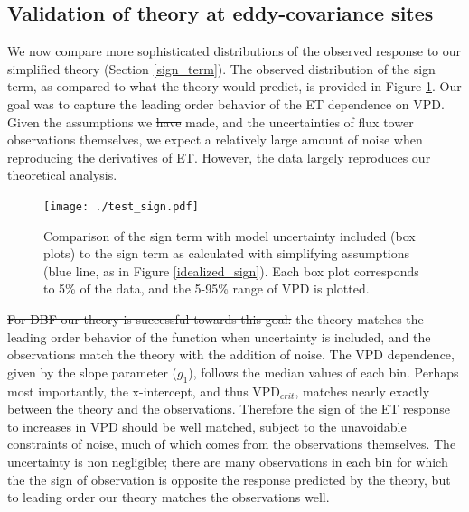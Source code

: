 \documentclass[draft,linenumbers]{agujournal}
\providecommand{\DIFadd}[1]{{\protect\color{blue}\uwave{#1}}} %
\providecommand{\DIFdel}[1]{{\protect\color{red}\sout{#1}}}                      %
\providecommand{\DIFaddbegin}{} %
\providecommand{\DIFaddend}{} %
\providecommand{\DIFdelbegin}{} %
\providecommand{\DIFdelend}{} %
\providecommand{\DIFaddbeginFL}{} %
\providecommand{\DIFaddendFL}{} %
\providecommand{\DIFdelbeginFL}{} %
\providecommand{\DIFdelendFL}{} %
\begin{document}
\subsection{Validation of theory at eddy-covariance sites}
\label{testing}
We now compare more sophisticated distributions of the observed
response to our simplified theory (Section \ref{sign_term}). The
observed distribution of the sign term, as compared to what the theory
would predict, is provided in Figure \ref{test_sign}. Our goal was to
capture the leading order behavior of the ET dependence on VPD. Given
the assumptions we \DIFdelbegin \DIFdel{have }\DIFdelend made, and the uncertainties of flux tower
observations themselves, we expect a relatively large amount of noise
when reproducing the derivatives of ET. However, the data largely
reproduces our theoretical analysis.

\begin{figure}
  \centering
  \DIFdelbeginFL %
\DIFdelendFL \DIFaddbeginFL \centerline{\texttt{[image: ./test\_sign.pdf]}}
  \DIFaddendFL \caption{Comparison of the sign term with model uncertainty included
    (box plots) to the sign term as calculated with simplifying
    assumptions (blue line, as in Figure \ref{idealized_sign}). Each
    box plot corresponds to 5\% of the data, and the 5-95\% range of
    VPD is plotted.}
  \label{test_sign}
\end{figure}

\DIFdelbegin \DIFdel{For DBF our theory is successful towards this goal: }\DIFdelend \DIFaddbegin \DIFadd{This is particularly true for DBF and MF; }\DIFaddend the theory matches the
leading order behavior of the function when uncertainty is included,
and the observations match the theory with the addition of noise. The
VPD dependence, given by the slope parameter ($g_1$), follows the
median values of each bin. Perhaps most importantly, the x-intercept,
and thus VPD$_{crit}$, matches nearly exactly between the theory and
the observations. Therefore the sign of the ET response to increases
in VPD should be well matched, subject to the unavoidable constraints
of noise, much of which comes from the observations themselves. The
uncertainty is non negligible; there are many observations in each bin
for which the the sign of observation is opposite the response
predicted by the theory, but to leading order our theory matches the
observations well.
\end{document}
